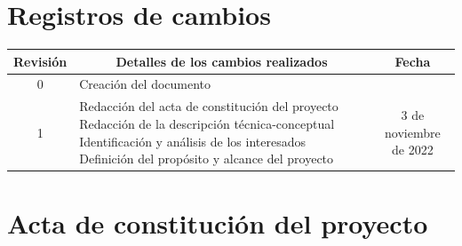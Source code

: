 \documentclass[
11pt, %
]{charter}
\begin{document}
\shorthandoff{>}
\shorthandoff{<}

\maketitle
\thispagestyle{empty}
\pagebreak


\thispagestyle{empty}
{\setlength{\parskip}{0pt}
\tableofcontents{}
}
\pagebreak


\section*{Registros de cambios}
\label{sec:registro}


\begin{table}[ht]
\label{tab:registro}
\centering
\begin{tabularx}{\linewidth}{@{}|c|X|c|@{}}
\hline
\rowcolor[HTML]{C0C0C0} 
Revisión & \multicolumn{1}{c|}{\cellcolor[HTML]{C0C0C0}Detalles de los cambios realizados} & Fecha      \\ \hline
0		& Creación del documento                                 &\fechaInicioName \\ \hline
1		& Redacción del acta de constitución del proyecto \newline
		Redacción de la descripción técnica-conceptual \newline
		Identificación y análisis de los interesados \newline
		Definición del propósito y alcance del proyecto
		& 3 de noviembre de 2022 \\ \hline
\end{tabularx}
\end{table}

\pagebreak



\section*{Acta de constitución del proyecto}
\label{sec:acta}
\end{document}
